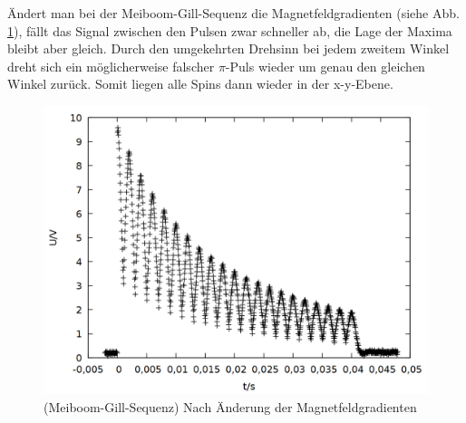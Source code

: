 Ändert man bei der Meiboom-Gill-Sequenz die Magnetfeldgradienten (siehe Abb. \ref{fig:gill_b}), fällt das Signal zwischen den Pulsen zwar schneller ab, die Lage der Maxima bleibt aber gleich. Durch den umgekehrten Drehsinn bei jedem zweitem Winkel dreht sich ein möglicherweise falscher $\pi$-Puls wieder um genau den gleichen Winkel zurück. Somit liegen alle Spins dann wieder in der x-y-Ebene.
  
\begin{figure}[h]
\centering
\includegraphics[width=0.75\linewidth]{data/p402_443_data/meiboom_gill_sequenz/plot_161.png}
\caption{(Meiboom-Gill-Sequenz) Nach Änderung der Magnetfeldgradienten}
\label{fig:gill_b}
\end{figure}


